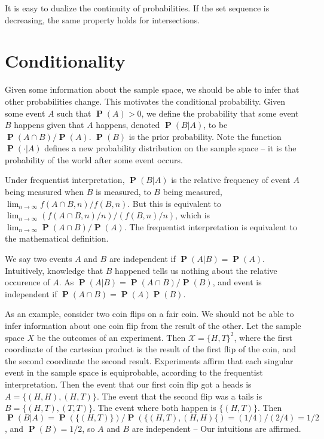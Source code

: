 \documentclass{report}
\DeclareMathOperator{\prob}{\mathbf{P}}
\begin{document}
It is easy to dualize the continuity of probabilities. If the set sequence is decreasing, the same property holds for intersections.

\section{Conditionality}

Given some information about the sample space, we should be able to infer that other probabilities change. This motivates the conditional probability. Given some event $A$ such that $\prob(A) > 0$, we define the probability that some event $B$ happens given that $A$ happens, denoted $\prob(B|A)$, to be $\prob(A \cap B)/\prob(A)$. $\prob(B)$ is the prior probability. Note the function $\prob(\cdotp | A)$ defines a new probability distribution on the sample space -- it is the probability of the world after some event occurs.

Under frequentist interpretation, $\prob(B|A)$ is the relative frequency of event $A$ being measured when $B$ is measured, to $B$ being measured, $\lim_{n \to \infty} f(A \cap B,n)/f(B, n)$. But this is equivalent to $\lim_{n \to \infty} (f(A \cap B,n)/n)/(f(B,n)/n)$, which is $\lim_{n \to \infty} \prob(A \cap B)/\prob(A)$. The frequentist interpretation is equivalent to the mathematical definition.

We say two events $A$ and $B$ are independent if $\prob(A|B) = \prob(A)$. Intuitively, knowledge that $B$ happened tells us nothing about the relative occurence of $A$. As $\prob(A|B) = \prob(A \cap B)/\prob(B)$, and event is independent if $\prob(A \cap B) = \prob(A)\prob(B)$.

As an example, consider two coin flips on a fair coin. We should not be able to infer information about one coin flip from the result of the other. Let the sample space $X$ be the outcomes of an experiment. Then $\mathcal{X} = \{ H,T \}^2$, where the first coordinate of the cartesian product is the result of the first flip of the coin, and the second coordinate the second result. Experiments affirm that each singular event in the sample space is equiprobable, according to the frequentist interpretation. Then the event that our first coin flip got a heads is $A = \{ (H,H), (H,T) \}$. The event that the second flip was a tails is $B = \{ (H,T), (T,T) \}$. The event where both happen is $\{ (H,T) \}$. Then $\prob(B|A) = \prob(\{ (H,T) \})/\prob(\{ (H,T), (H,H) \{) = (1/4)/(2/4) = 1/2$, and $\prob(B) = 1/2$, so $A$ and $B$ are independent -- Our intuitions are affirmed.
\end{document}
